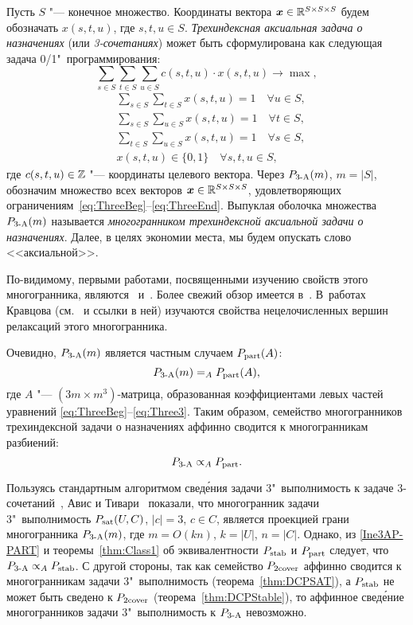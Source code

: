 Пусть $S$ "--- конечное множество.
Координаты вектора $\bm{x}\in\mathbb{R}^{S\times S\times S}$
будем обозначать $x(s, t, u)$, где $s,t,u\in S$.
\emph{Трехиндексная аксиальная задача о назначениях} (или \emph{3-сочетаниях}) может быть сформулирована как следующая задача 0/1"~программирования:
\[
\sum_{s\in S} \sum_{t\in S} \sum_{u\in S} c(s,t,u) \cdot x(s,t,u) 
\rightarrow \max,
\] 
\begin{align}
&\sum_{s\in S} \sum_{t\in S} x(s,t,u) = 1 \quad \forall u\in S,\label{eq:ThreeBeg}\\
&\sum_{s\in S} \sum_{u\in S} x(s,t,u) = 1 \quad \forall t\in S,\label{eq:Three2}\\
&\sum_{t\in S} \sum_{u\in S} x(s,t,u) = 1 \quad \forall s\in S,\label{eq:Three3}\\
&x(s,t,u) \in \{0, 1\} \quad \forall s, t, u\in S,\label{eq:ThreeEnd}
\end{align}
где $c(s,t,u)\in\mathbb{Z}$ "--- координаты целевого вектора.
Через $P_{\textup{3-A}}(m)$, $m = |S|$, обозначим множество всех векторов $\bm{x}\in\mathbb{R}^{S\times S\times S}$, удовлетворяющих ограничениям~\eqref{eq:ThreeBeg}--\eqref{eq:ThreeEnd}.
Выпуклая оболочка множества $P_{\textup{3-A}}(m)$ называется \emph{многогранником трехиндексной аксиальной задачи о назначениях}.
Далее, в целях экономии места, мы будем опускать слово <<аксиальной>>.

По-видимому, первыми работами, посвященными изучению свойств этого многогранника, являются~\cite{Euler:1987} и~\cite{Balas:1989}.
Более свежий обзор имеется в~\cite{Qi:2000}.
В~работах Кравцова (см.~\cite{Kravtsov:2006} и ссылки в ней) изучаются свойства нецелочисленных вершин релаксаций этого многогранника.

Очевидно, $P_{\textup{3-A}}(m)$ является частным случаем $P_{\textup{part}}(A)$:
\begin{equation}
\label{Ine3AP-PART}
P_{\textup{3-A}}(m) =_A P_{\textup{part}}(A),
\end{equation}
где $A$ "--- $(3m\times m^3)$-матрица, образованная коэффициентами левых частей уравнений \eqref{eq:ThreeBeg}--\eqref{eq:Three3}.
Таким образом, семейство многогранников трехиндексной задачи о назначениях аффинно сводится к многогранникам разбиений: 
\[
P_{\textup{3-A}} \propto_A P_{\textup{part}}.
\]

Пользуясь стандартным алгоритмом свед\'{е}ния задачи 3"~выполнимость к задаче 3-сочетаний~\cite{Garey:1982}, Авис и Тивари~\cite{AvisTiwary:2015} показали, что многогранник задачи 3"~выполнимость $P_{\textup{sat}}(U,C)$, $|c|=3$, $c\in C$, является проекцией грани многогранника $P_{\textup{3-A}}(m)$, где $m = O(kn)$, $k=|U|$, $n=|C|$.
Однако, из \eqref{Ine3AP-PART} и теоремы~\ref{thm:Class1} об эквивалентности $P_{\textup{stab}}$ и $P_{\textup{part}}$ следует, что $P_{\textup{3-A}} \propto_A P_{\textup{stab}}$.
С другой стороны, так как семейство $P_{\textup{2cover}}$ аффинно сводится к многогранникам задачи 3"~выполнимость (теорема~\ref{thm:DCPSAT}), а $P_{\textup{stab}}$ не может быть сведено к $P_{\textup{2cover}}$ (теорема~\ref{thm:DCPStable}), то аффинное свед\'{е}ние многогранников задачи 3"~выполнимость к $P_{\textup{3-A}}$ невозможно.

